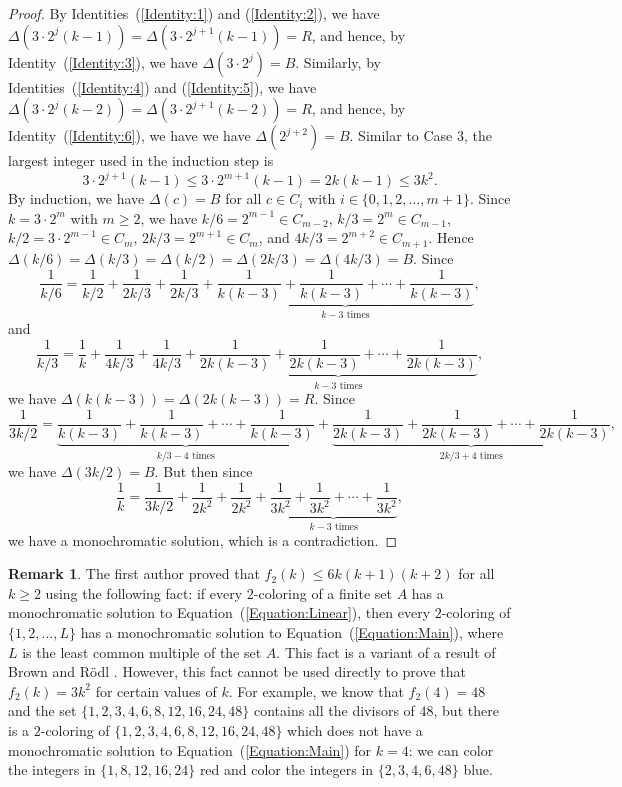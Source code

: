 \documentclass[11pt]{article}
\theoremstyle{definition}
\newtheorem{remark}[theorem]{Remark}
\begin{document}
\begin{proof}
By Identities~(\ref{Identity:1}) and (\ref{Identity:2}), we have $\Delta(3\cdot2^{j}(k-1))=\Delta(3\cdot2^{j+1}(k-1))= R$, and hence, by Identity~(\ref{Identity:3}), we have $\Delta(3\cdot2^{j})=B$. Similarly, by Identities~(\ref{Identity:4}) and (\ref{Identity:5}), we have $\Delta(3\cdot2^{j}(k-2))=\Delta(3\cdot2^{j+1}(k-2))=R$, and hence, by Identity~(\ref{Identity:6}), we have we have $\Delta(2^{j+2})=B$. Similar to Case 3, the largest integer used in the induction step is
\[
3\cdot2^{j+1}(k-1)\leq 3\cdot2^{m+1}(k-1)=2k(k-1)\leq 3k^2.
\]
By induction, we have $\Delta(c)=B$ for all $c\in C_i$ with $i\in\{0,1,2,\ldots,m+1\}$. Since $k=3\cdot2^m$ with $m\geq2$, we have $k/6=2^{m-1}\in C_{m-2}$, $k/3=2^m\in C_{m-1}$, $k/2=3\cdot 2^{m-1}\in C_{m}$, $2k/3=2^{m+1}\in C_m$, and $4k/3=2^{m+2}\in C_{m+1}$. Hence $\Delta(k/6)=\Delta(k/3)=\Delta(k/2)=\Delta(2k/3)=\Delta(4k/3)=B$. Since
\[
\frac{1}{k/6}=\frac{1}{k/2}+\frac{1}{2k/3}+\frac{1}{2k/3}+\underbrace{\frac{1}{k(k-3)}+\frac{1}{k(k-3)}+\cdots+\frac{1}{k(k-3)}}_{k-3\text{ times}},
\]
and
\[
\frac{1}{k/3}=\frac{1}{k}+\frac{1}{4k/3}+\frac{1}{4k/3}+\underbrace{\frac{1}{2k(k-3)}+\frac{1}{2k(k-3)}+\cdots+\frac{1}{2k(k-3)}}_{k-3\text{ times}},
\]
we have $\Delta(k(k-3))=\Delta(2k(k-3))=R$. Since
\[
\frac{1}{3k/2}=\underbrace{\frac{1}{k(k-3)}+\frac{1}{k(k-3)}+\cdots+\frac{1}{k(k-3)}}_{k/3-4\text{ times}}+\underbrace{\frac{1}{2k(k-3)}+\frac{1}{2k(k-3)}+\cdots+\frac{1}{2k(k-3)}}_{2k/3+4\text{ times}},
\]
we have $\Delta(3k/2)=B$. But then since
    \[
    \frac{1}{k}=\frac{1}{3k/2}+\frac{1}{2k^2}+\frac{1}{2k^2}+\underbrace{\frac{1}{3k^2}+\frac{1}{3k^2}+\cdots+\frac{1}{3k^2}}_{k-3\text{ times}},
    \]
    we have a monochromatic solution, which is a contradiction.
\end{proof}





\begin{remark}
    The first author \cite{Gaiser2024} proved that $f_2(k)\leq 6k(k+1)(k+2)$ for all $k\geq2$ using the following fact: if every $2$-coloring of a finite set $A$ has a monochromatic solution to Equation~(\ref{Equation:Linear}), then every $2$-coloring of $\{1,2,\ldots,L\}$ has a monochromatic solution to Equation~(\ref{Equation:Main}), where $L$ is the least common multiple of the set $A$. This fact is a variant of a result of Brown and R\"{o}dl \cite{BrownRodl1991}. However, this fact cannot be used directly to prove that $f_2(k)=3k^2$ for certain values of $k$. For example, we know that $f_2(4)=48$ and the set $\{1,2,3,4,6,8,12,16,24,48\}$ contains all the divisors of $48$, but there is a $2$-coloring of $\{1,2,3,4,6,8,12,16,24,48\}$ which does not have a monochromatic solution to Equation~(\ref{Equation:Main}) for $k=4$: we can color the integers in $\{1,8,12,16,24\}$ red and color the integers in $\{2,3,4,6,48\}$ blue.
\end{remark}
\end{document}
